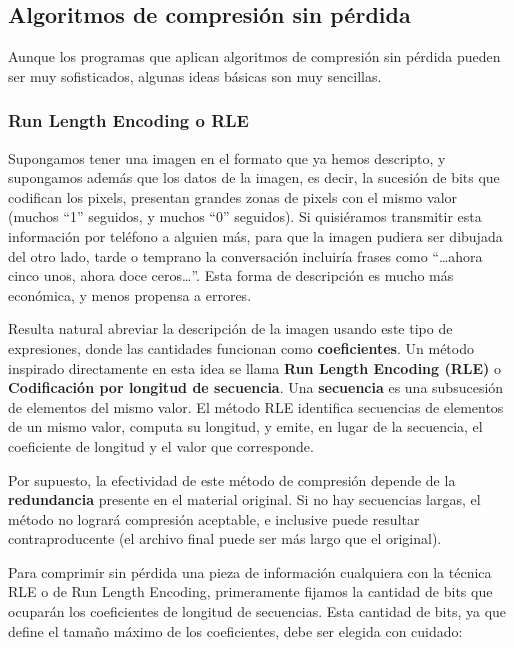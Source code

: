 \documentclass[spanish,a4paper,]{article}
\begin{document}
\hypertarget{algoritmos-de-compresiuxf3n-sin-puxe9rdida}{%
\subsection{Algoritmos de compresión sin
pérdida}\label{algoritmos-de-compresiuxf3n-sin-puxe9rdida}}

Aunque los programas que aplican algoritmos de compresión sin pérdida
pueden ser muy sofisticados, algunas ideas básicas son muy sencillas.

\hypertarget{run-length-encoding-o-rle}{%
\subsubsection{Run Length Encoding o
RLE}\label{run-length-encoding-o-rle}}

Supongamos tener una imagen en el formato que ya hemos descripto, y
supongamos además que los datos de la imagen, es decir, la sucesión de
bits que codifican los pixels, presentan grandes zonas de pixels con el
mismo valor (muchos ``1'' seguidos, y muchos ``0'' seguidos). Si
quisiéramos transmitir esta información por teléfono a alguien más, para
que la imagen pudiera ser dibujada del otro lado, tarde o temprano la
conversación incluiría frases como ``\ldots{}ahora cinco unos, ahora
doce ceros\ldots{}''. Esta forma de descripción es mucho más económica,
y menos propensa a errores.

Resulta natural abreviar la descripción de la imagen usando este tipo de
expresiones, donde las cantidades funcionan como \textbf{coeficientes}.
Un método inspirado directamente en esta idea se llama \textbf{Run
Length Encoding (RLE)} o \textbf{Codificación por longitud de
secuencia}. Una \textbf{secuencia} es una subsucesión de elementos del
mismo valor. El método RLE identifica secuencias de elementos de un
mismo valor, computa su longitud, y emite, en lugar de la secuencia, el
coeficiente de longitud y el valor que corresponde.

Por supuesto, la efectividad de este método de compresión depende de la
\textbf{redundancia} presente en el material original. Si no hay
secuencias largas, el método no logrará compresión aceptable, e
inclusive puede resultar contraproducente (el archivo final puede ser
más largo que el original).

Para comprimir sin pérdida una pieza de información cualquiera con la
técnica RLE o de Run Length Encoding, primeramente fijamos la cantidad
de bits que ocuparán los coeficientes de longitud de secuencias. Esta
cantidad de bits, ya que define el tamaño máximo de los coeficientes,
debe ser elegida con cuidado:
\end{document}
